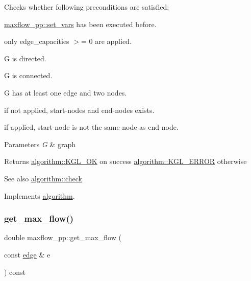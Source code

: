 Checks whether following preconditions are satisfied\+: 
\begin{DoxyItemize}
\item \mbox{\hyperlink{classmaxflow__pp_ac77f4c613efe7857e053f9bfb103dc3e}{maxflow\+\_\+pp\+::set\+\_\+vars}} has been executed before. 
\item only edge\+\_\+capacities $>$= 0 are applied. 
\item {\ttfamily G} is directed. 
\item {\ttfamily G} is connected. 
\item {\ttfamily G} has at least one edge and two nodes. 
\item if not applied, start-\/nodes and end-\/nodes exists. 
\item if applied, start-\/node is not the same node as end-\/node. 
\end{DoxyItemize}


\begin{DoxyParams}{Parameters}
{\em G} & graph \\
\hline
\end{DoxyParams}
\begin{DoxyReturn}{Returns}
{\ttfamily \mbox{\hyperlink{classalgorithm_af1a0078e153aa99c24f9bdf0d97f6710aae4c1cd7fe8d8cf4b143241a6e7c31cf}{algorithm\+::\+K\+G\+L\+\_\+\+OK}}} on success {\ttfamily \mbox{\hyperlink{classalgorithm_af1a0078e153aa99c24f9bdf0d97f6710ae67bf27b2ef31f73e545a7f9f4a69556}{algorithm\+::\+K\+G\+L\+\_\+\+E\+R\+R\+OR}}} otherwise 
\end{DoxyReturn}
\begin{DoxySeeAlso}{See also}
\mbox{\hyperlink{classalgorithm_a76361fb03ad1cf643affc51821e43bed}{algorithm\+::check}} 
\end{DoxySeeAlso}


Implements \mbox{\hyperlink{classalgorithm_a76361fb03ad1cf643affc51821e43bed}{algorithm}}.

\mbox{\label{classmaxflow__pp_ac561a61619f363ef5d9b8fc5cfb10a5f}} 
\subsubsection{\texorpdfstring{get\+\_\+max\+\_\+flow()}{get\_max\_flow()}\hspace{0.1cm}{\footnotesize\ttfamily [1/2]}}
{\footnotesize\ttfamily double maxflow\+\_\+pp\+::get\+\_\+max\+\_\+flow (\begin{DoxyParamCaption}\item[{const \mbox{\hyperlink{classedge}{edge}} \&}]{e }\end{DoxyParamCaption}) const}


